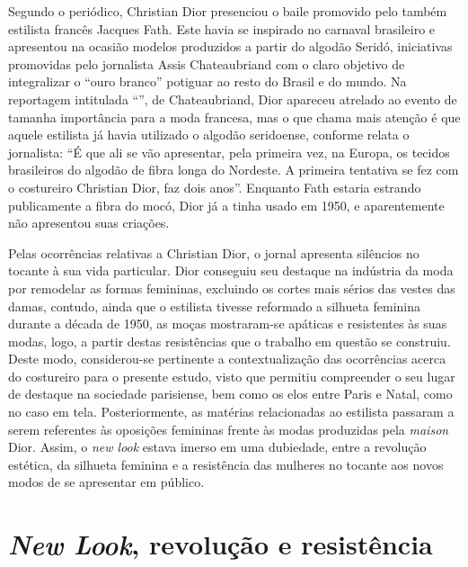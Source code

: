 \begin{refsection}
    Segundo o periódico, Christian Dior presenciou o baile promovido pelo também estilista francês Jacques Fath. Este havia se inspirado no carnaval brasileiro e apresentou na ocasião modelos produzidos a partir do algodão Seridó, iniciativas promovidas pelo jornalista Assis Chateaubriand com o claro objetivo de integralizar o ``ouro branco'' potiguar ao resto do Brasil e do mundo. Na reportagem intitulada ``'', de Chateaubriand, Dior apareceu atrelado ao evento de tamanha importância para a moda francesa, mas o que chama mais atenção é que aquele estilista já havia utilizado o algodão seridoense, conforme relata o jornalista: ``É que ali se vão apresentar, pela primeira vez, na Europa, os tecidos brasileiros do algodão de fibra longa do Nordeste. A primeira tentativa se fez com o costureiro Christian Dior, faz dois anos''. Enquanto Fath estaria estrando publicamente a fibra do mocó, Dior já a tinha usado em 1950, e aparentemente não apresentou suas criações.

    Pelas ocorrências relativas a Christian Dior, o jornal apresenta silêncios no tocante à sua vida particular. Dior conseguiu seu destaque na indústria da moda por remodelar as formas femininas, excluindo os cortes mais sérios das vestes das damas, contudo, ainda que o estilista tivesse reformado a silhueta feminina durante a década de 1950, as moças mostraram-se apáticas e resistentes às suas modas, logo, a partir destas resistências que o trabalho em questão se construiu. Deste modo, considerou-se pertinente a contextualização das ocorrências acerca do costureiro para o presente estudo, visto que permitiu compreender o seu lugar de destaque na sociedade parisiense, bem como os elos entre Paris e Natal, como no caso em tela. Posteriormente, as matérias relacionadas ao estilista passaram a serem referentes às oposições femininas frente às modas produzidas pela \textit{maison} Dior. Assim, o \textit{new look} estava imerso em uma dubiedade, entre a revolução estética, da silhueta feminina e a resistência das mulheres no tocante aos novos modos de se apresentar em público.

    \section{\textit{New Look}, revolução e resistência}


\end{refsection}
